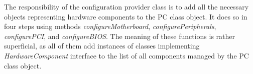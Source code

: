 %
%

The responsibility of the configuration provider class is to add all the
necessary objects representing hardware components to the PC class object. It
does so in four steps using methods \emph{configureMotherboard},
\emph{configurePeripherals}, \emph{configurePCI}, and \emph{configureBIOS}. The
meaning of these functions is rather superficial, as all of them add instances
of classes implementing \emph{HardwareComponent} interface to the list of all
components managed by the PC class object.


\begin{codeblock}
    
\end{codeblock}

%
%
%


